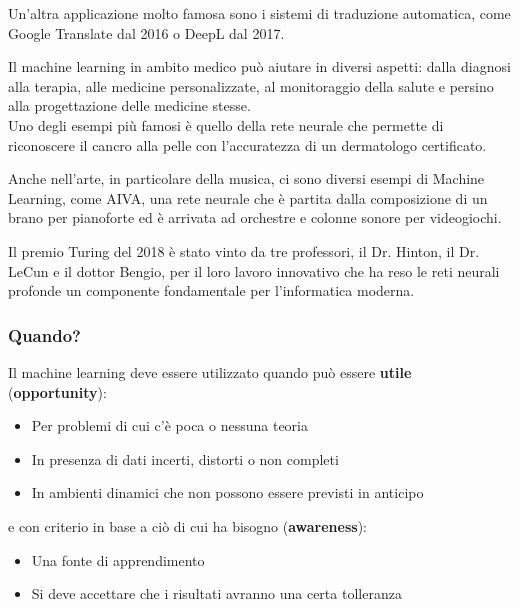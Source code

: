 \begin{example}[Traduzione]
	Un'altra applicazione molto famosa sono i sistemi di traduzione automatica, come Google Translate dal 2016 o DeepL dal 2017.
\end{example}
\begin{example}[Medicina]
	Il machine learning in ambito medico può aiutare in diversi aspetti: dalla diagnosi alla terapia, alle medicine personalizzate, al monitoraggio della salute e persino alla progettazione delle medicine stesse.\\
	Uno degli esempi più famosi è quello della rete neurale che permette di riconoscere il cancro alla pelle con l'accuratezza di un dermatologo certificato.
\end{example}
\begin{example}[Musica]
	Anche nell'arte, in particolare della musica, ci sono diversi esempi di Machine Learning, come AIVA, una rete neurale che è partita dalla composizione di un brano per pianoforte ed è arrivata ad orchestre e colonne sonore per videogiochi.
\end{example}
\begin{note}
	Il premio Turing del 2018 è stato vinto da tre professori, il Dr. Hinton, il Dr. LeCun e il dottor Bengio, per il loro lavoro innovativo che ha reso le reti neurali profonde un componente fondamentale per l'informatica moderna.
\end{note}

\subsubsection{Quando?}
Il machine learning deve essere utilizzato quando può essere \textbf{utile} (\textbf{opportunity}):
\begin{itemize}
	\item Per problemi di cui c'è poca o nessuna teoria
	\item In presenza di dati incerti, distorti o non completi
	\item In ambienti dinamici che non possono essere previsti in anticipo
\end{itemize}
e con criterio in base a ciò di cui ha bisogno (\textbf{awareness}):
\begin{itemize}
	\item Una fonte di apprendimento
	\item Si deve accettare che i risultati avranno una certa tolleranza
\end{itemize}

